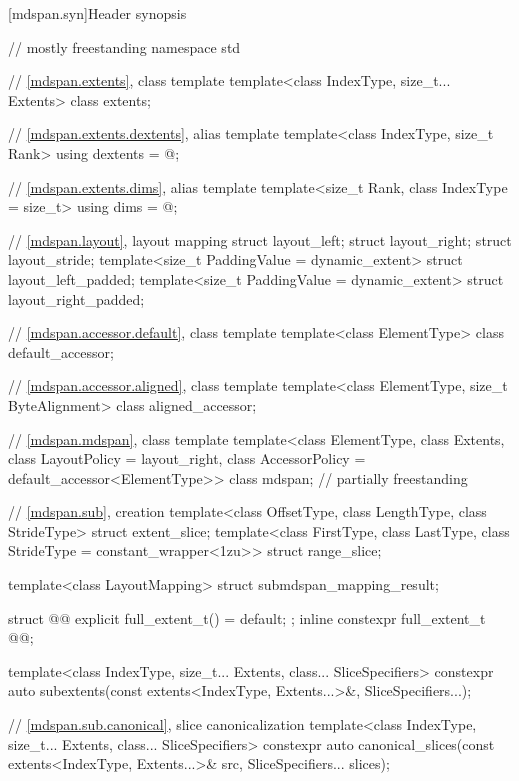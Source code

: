 [mdspan.syn]{Header  synopsis}

%
\begin{codeblock}
// mostly freestanding
namespace std {
  // \ref{mdspan.extents}, class template 
  template<class IndexType, size_t... Extents>
    class extents;

  // \ref{mdspan.extents.dextents}, alias template 
  template<class IndexType, size_t Rank>
    using dextents = @\seebelow@;

  // \ref{mdspan.extents.dims}, alias template 
  template<size_t Rank, class IndexType = size_t>
    using dims = @\seebelow@;

  // \ref{mdspan.layout}, layout mapping
  struct layout_left;
  struct layout_right;
  struct layout_stride;
  template<size_t PaddingValue = dynamic_extent>
    struct layout_left_padded;
  template<size_t PaddingValue = dynamic_extent>
    struct layout_right_padded;

  // \ref{mdspan.accessor.default}, class template 
  template<class ElementType>
    class default_accessor;

  // \ref{mdspan.accessor.aligned}, class template 
  template<class ElementType, size_t ByteAlignment>
    class aligned_accessor;

  // \ref{mdspan.mdspan}, class template 
  template<class ElementType, class Extents, class LayoutPolicy = layout_right,
           class AccessorPolicy = default_accessor<ElementType>>
    class mdspan;                                                           // partially freestanding

  // \ref{mdspan.sub},  creation
  template<class OffsetType, class LengthType, class StrideType>
    struct extent_slice;
  template<class FirstType, class LastType, class StrideType = constant_wrapper<1zu>>
    struct range_slice;

  template<class LayoutMapping>
    struct submdspan_mapping_result;

  struct @@ { explicit full_extent_t() = default; };
  inline constexpr full_extent_t @@{};

  template<class IndexType, size_t... Extents, class... SliceSpecifiers>
    constexpr auto subextents(const extents<IndexType, Extents...>&, SliceSpecifiers...);

  // \ref{mdspan.sub.canonical},  slice canonicalization
  template<class IndexType, size_t... Extents, class... SliceSpecifiers>
    constexpr auto canonical_slices(const extents<IndexType, Extents...>& src,
                                    SliceSpecifiers... slices);

}
\end{codeblock}
